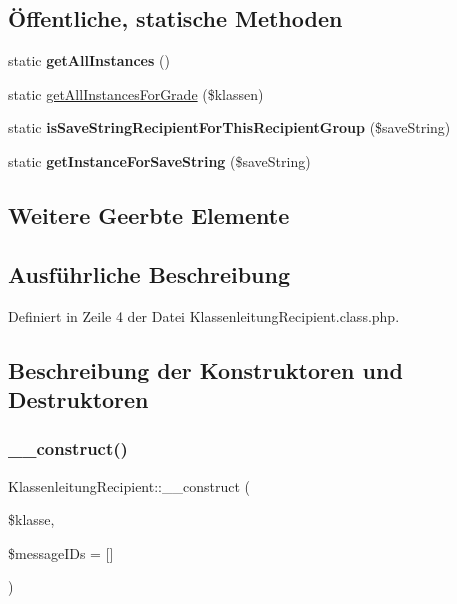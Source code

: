 \subsection*{Öffentliche, statische Methoden}
\begin{DoxyCompactItemize}
\item 
\mbox{\label{class_klassenleitung_recipient_a7f94f0ea0600b9f8ca21d0dca8c3185e}} 
static {\bfseries get\+All\+Instances} ()
\item 
static \mbox{\hyperlink{class_klassenleitung_recipient_a7e68063547dc964131b622fd5e11e9ba}{get\+All\+Instances\+For\+Grade}} (\$klassen)
\item 
\mbox{\label{class_klassenleitung_recipient_a4b50a73b7b941b9c9e91e112df4c3ecf}} 
static {\bfseries is\+Save\+String\+Recipient\+For\+This\+Recipient\+Group} (\$save\+String)
\item 
\mbox{\label{class_klassenleitung_recipient_af2e6f0f455c1f163fef248a3bec2e5b7}} 
static {\bfseries get\+Instance\+For\+Save\+String} (\$save\+String)
\end{DoxyCompactItemize}
\subsection*{Weitere Geerbte Elemente}


\subsection{Ausführliche Beschreibung}


Definiert in Zeile 4 der Datei Klassenleitung\+Recipient.\+class.\+php.



\subsection{Beschreibung der Konstruktoren und Destruktoren}
\mbox{\label{class_klassenleitung_recipient_a336506594aa65ae6ab5bf4a12ee10e02}} 
\subsubsection{\texorpdfstring{\+\_\+\+\_\+construct()}{\_\_construct()}}
{\footnotesize\ttfamily Klassenleitung\+Recipient\+::\+\_\+\+\_\+construct (\begin{DoxyParamCaption}\item[{}]{\$klasse,  }\item[{}]{\$message\+I\+Ds = {\ttfamily \mbox{[}\mbox{]}} }\end{DoxyParamCaption})}

